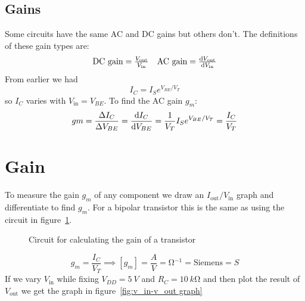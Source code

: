 \documentclass{article}
\begin{document}
    \subsection{Gains}
    Some circuits have the same AC and DC gains but others don't. The definitions of these gain types are:
    \[
        \begin{array}{cc}
            \text{DC gain} = \frac{V_\text{out}}{V_\text{in}} & \text{AC gain} = \dv{V_\text{out}}{V_\text{in}}
        \end{array}
     \]
     From earlier we had 
     \[I_C=I_Se^{V_{BE}/V_T}\]
     so \(I_C\) varies with \(V_\text{in}=V_{BE}\). To find the AC gain \(g_m\):
     \begin{equation}\label{eqn:gm=IC/VT}
        gm = \frac{\Delta I_C}{\Delta V_{BE}}=\dv{I_C}{V_{BE}}=\frac{1}{V_T}I_Se^{V_{BE}/V_T}=\frac{I_C}{V_T}
     \end{equation}
     \section{Gain}
     
     To measure the gain \(g_m\) of any component we draw an \(I_\text{out}/V_\text{in}\) graph and differentiate to find \(g_m\).
     For a bipolar transistor this is the same as using the circuit in figure~\ref{fig:transistor gain}.
     
     \begin{figure}[ht]
         \centering
         \caption{Circuit for calculating the gain of a transistor}
         \label{fig:transistor gain}
     \end{figure}
    \[g_m = \frac{I_C}{V_T}\implies [g_m] = \frac{\si{A}}{\si{V}} = \si{\ohm^{-1}} = \text{Siemens} = \si{S}\]
    If we vary \(V_\text{in}\) while fixing \(V_{DD} = \SI{5}{V}\) and \(R_C = \SI{10}{k\ohm}\) and then plot the result of \(V_\text{out}\) we get the graph in figure~\ref{fig:v_in-v_out graph}
    
\end{document}
